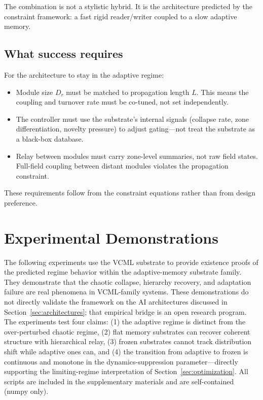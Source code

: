 \documentclass[12pt]{article}
\begin{document}
The combination is not a stylistic hybrid. It is the architecture predicted by the constraint framework: a fast rigid reader/writer coupled to a slow adaptive memory.

\subsection{What success requires}

For the architecture to stay in the adaptive regime:
\begin{itemize}
  \item Module size $D_r$ must be matched to propagation length $L$. This means the coupling and turnover rate must be co-tuned, not set independently.
  \item The controller must use the substrate's internal signals (collapse rate, zone differentiation, novelty pressure) to adjust gating---not treat the substrate as a black-box database.
  \item Relay between modules must carry zone-level summaries, not raw field states. Full-field coupling between distant modules violates the propagation constraint.
\end{itemize}

These requirements follow from the constraint equations rather than from design preference.

\section{Experimental Demonstrations}
\label{sec:experiments}

The following experiments use the VCML substrate to provide existence proofs of the predicted regime behavior within the adaptive-memory substrate family. They demonstrate that the chaotic collapse, hierarchy recovery, and adaptation failure are real phenomena in VCML-family systems. These demonstrations do not directly validate the framework on the AI architectures discussed in Section~\ref{sec:architectures}; that empirical bridge is an open research program. The experiments test four claims: (1) the adaptive regime is distinct from the over-perturbed chaotic regime, (2) flat memory substrates can recover coherent structure with hierarchical relay, (3) frozen substrates cannot track distribution shift while adaptive ones can, and (4) the transition from adaptive to frozen is continuous and monotone in the dynamics-suppression parameter---directly supporting the limiting-regime interpretation of Section~\ref{sec:optimization}. All scripts are included in the supplementary materials and are self-contained (numpy only).
\end{document}

